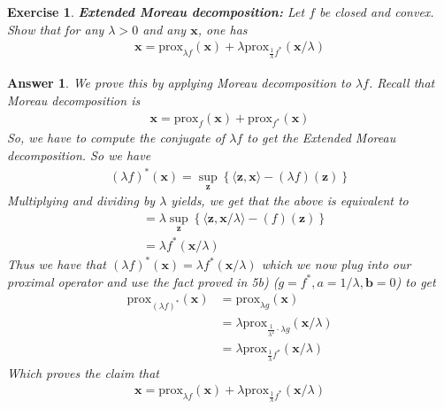 \documentclass[12pt]{article}
\theoremstyle{colon}
\newtheorem{exercise}{Exercise}
\newtheorem*{answer}{Answer}
\begin{document}
\clearpage

\begin{exercise}
	\textbf{Extended Moreau decomposition:} Let $f$ be closed and convex. Show that for any $\lambda > 0 $ and any $\bm{x}$, one has
	\begin{gather*}
		\bm{x} = \text{prox}_{\lambda f} (\bm{x}) + \lambda \text{prox}_{\frac{1}{\lambda} f^*} (\bm{x}/\lambda)
	\end{gather*}
\end{exercise}

\begin{answer}
	We prove this by applying Moreau decomposition to $\lambda f$. Recall that Moreau decomposition is
	\begin{gather*}
		\bm{x} = \text{prox}_{f} (\bm{x}) + \text{prox}_{f^*} (\bm{x})
	\end{gather*}
	So, we have to compute the conjugate of $\lambda f$ to get the Extended Moreau decomposition. So we have
	\begin{gather*}
		(\lambda f)^* (\bm{x}) = \sup_{\bm{z}} \left\{ \langle \bm{z}, \bm{x} \rangle - (\lambda f)(\bm{z}) \right\} 
	\end{gather*}
	Multiplying and dividing by $\lambda$ yields, we get that the above is equivalent to
	\begin{align*}
		&= \lambda \sup_{\bm{z}} \left\{ \langle \bm{z}, \bm{x}/\lambda \rangle - (f)(\bm{z}) \right\} \\
		&= \lambda f^*(\bm{x}/\lambda)
	\end{align*}
	Thus we have that $(\lambda f)^* (\bm{x}) = \lambda f^*(\bm{x}/\lambda)$ which we now plug into our proximal operator and use the fact proved in 5b) ($g = f^*, a = 1/\lambda, \bm{b}=0$) to get
	\begin{align*}
		\text{prox}_{(\lambda f)^*} (\bm{x}) &= \text{prox}_{\lambda g} (\bm{x}) \\
		&= \lambda \text{prox}_{\frac{1}{\lambda^2} \cdot \lambda g} (\bm{x} / \lambda) \\
		&= \lambda \text{prox}_{\frac{1}{\lambda} f^*} (\bm{x}/\lambda)
	\end{align*}
	Which proves the claim that
	\begin{gather*}
		\bm{x} = \text{prox}_{\lambda f} (\bm{x}) + \lambda \text{prox}_{\frac{1}{\lambda} f^*} (\bm{x}/\lambda)
	\end{gather*}
\end{answer}
\end{document}
